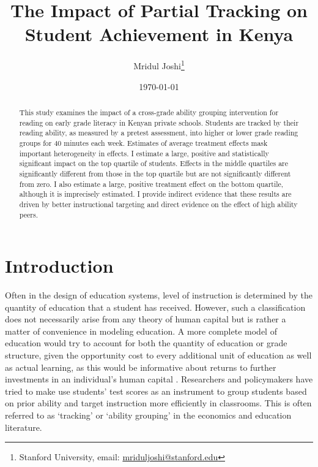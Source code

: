 \documentclass[12pt]{article}
\title{The Impact of Partial Tracking on Student Achievement in Kenya}
\begin{document}
\begin{titlepage}
\author{Mridul Joshi\footnote{Stanford University, email: \protect\href{mailto:mriduljoshi@stanford.edu}{mriduljoshi@stanford.edu}}}

\date{ \today \\}
\maketitle

\begin{abstract}\noindent
This study examines the impact of a cross-grade ability grouping intervention for reading on early grade literacy in Kenyan private schools. Students are tracked by their reading ability, as measured by a pretest assessment, into higher or lower grade reading groups for 40 minutes each week. Estimates of average treatment effects mask important heterogeneity in effects. I estimate a large, positive and statistically significant impact on the top quartile of students. Effects in the middle quartiles are significantly different from those in the top quartile but are not significantly different from zero. I also estimate a large, positive treatment effect on the bottom quartile, although it is imprecisely estimated. I provide indirect evidence that these results are driven by better instructional targeting and direct evidence on the effect of high ability peers.

\end{abstract}
\setcounter{page}{0}
\thispagestyle{empty}
\end{titlepage}
\doublespacing

\section{Introduction}
Often in the design of education systems, level of instruction is determined by the quantity of education that a student has received. However, such a classification does not necessarily arise from any theory of human capital but is rather a matter of convenience in modeling education. A more complete model of education would try to account for both the quantity of education or grade structure, given the opportunity cost to every additional unit of education as well as actual learning, as this would be informative about returns to further investments in an individual's human capital  \citep{becker2009human}. Researchers and policymakers have tried to make use students' test scores as an instrument to group students based on prior ability and target instruction more efficiently in classrooms. This is often referred to as `tracking' or `ability grouping' in the economics and education literature. 
\end{document}
